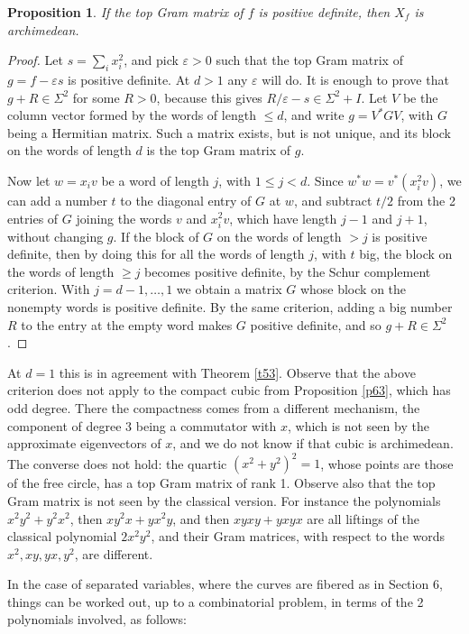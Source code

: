 \documentclass[11pt]{amsart}
\newtheorem{proposition}[theorem]{Proposition}
\theoremstyle{definition}
\begin{document}
\begin{proposition}\label{p71}
If the top Gram matrix of $f$ is positive definite, then $X_f$ is archimedean.
\end{proposition}

\begin{proof}
Let $s=\sum_ix_i^2$, and pick $\varepsilon>0$ such that the top Gram matrix of $g=f-\varepsilon s$ is positive definite. At $d>1$ any $\varepsilon$ will do. It is enough to prove that $g+R\in\Sigma^2$ for some $R>0$, because this gives $R/\varepsilon-s\in\Sigma^2+I$. Let $V$ be the column vector formed by the words of length $\leq d$, and write $g=V^*GV$, with $G$ being a Hermitian matrix. Such a matrix exists, but is not unique, and its block on the words of length $d$ is the top Gram matrix of $g$.

Now let $w=x_iv$ be a word of length $j$, with $1\leq j<d$. Since $w^*w=v^*(x_i^2v)$, we can add a number $t$ to the diagonal entry of $G$ at $w$, and subtract $t/2$ from the 2 entries of $G$ joining the words $v$ and $x_i^2v$, which have length $j-1$ and $j+1$, without changing $g$. If the block of $G$ on the words of length $>j$ is positive definite, then by doing this for all the words of length $j$, with $t$ big, the block on the words of length $\geq j$ becomes positive definite, by the Schur complement criterion. With $j=d-1,\ldots,1$ we obtain a matrix $G$ whose block on the nonempty words is positive definite. By the same criterion, adding a big number $R$ to the entry at the empty word makes $G$ positive definite, and so $g+R\in\Sigma^2$.
\end{proof}

At $d=1$ this is in agreement with Theorem \ref{t53}. Observe that the above criterion does not apply to the compact cubic from Proposition \ref{p63}, which has odd degree. There the compactness comes from a different mechanism, the component of degree 3 being a commutator with $x$, which is not seen by the approximate eigenvectors of $x$, and we do not know if that cubic is archimedean. The converse does not hold: the quartic $(x^2+y^2)^2=1$, whose points are those of the free circle, has a top Gram matrix of rank 1. Observe also that the top Gram matrix is not seen by the classical version. For instance the polynomials $x^2y^2+y^2x^2$, then $xy^2x+yx^2y$, and then $xyxy+yxyx$ are all liftings of the classical polynomial $2x^2y^2$, and their Gram matrices, with respect to the words $x^2,xy,yx,y^2$, are different.

In the case of separated variables, where the curves are fibered as in Section 6, things can be worked out, up to a combinatorial problem, in terms of the 2 polynomials involved, as follows:
\end{document}
